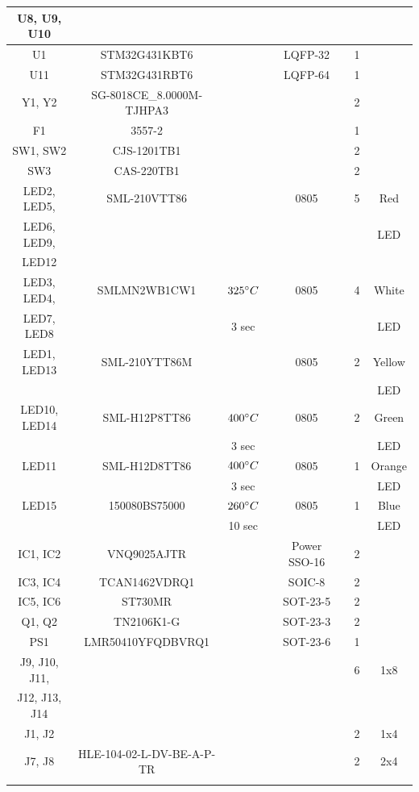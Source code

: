 \documentclass[10pt]{datasheet}
\begin{document}
\begin{longtable}{| c | c | c | c | c | c | c | c |}
    U8, U9, U10 & & & & & & &\\
    \hline
    U1 & STM32G431KBT6 & & & LQFP-32 & \cite{ref8} & 1 &\\
    \hline
    U11 & STM32G431RBT6 & & & LQFP-64 & \cite{ref8} & 1 &\\
    \hline
    Y1, Y2 & SG-8018CE\_8.0000M-TJHPA3 & & & & \cite{ref10} & 2 &\\
    \hline
    F1 & 3557-2 & & & & \cite{ref43} & 1 &\\
    \hline
    SW1, SW2 & CJS-1201TB1 & & & & \cite{ref44} & 2 &\\
    \hline
    SW3 & CAS-220TB1 & & & & \cite{ref45} & 2 &\\
    \hline
    LED2, LED5, & SML-210VTT86 & & & 0805 & \cite{ref46} & 5 & Red\\
    LED6, LED9, & & & & & & & LED\\
    LED12 & & & & & & & \\
    \hline
    LED3, LED4, & SMLMN2WB1CW1 & $325\degree C$ & & 0805 & \cite{ref47} & 4 & White\\
    LED7, LED8 & & 3 sec & & & & & LED\\
    \hline
    LED1, LED13 & SML-210YTT86M & & & 0805 & \cite{ref46} & 2 & Yellow\\
    & & & & & & & LED\\
    \hline
    LED10, LED14 & SML-H12P8TT86 & $400\degree C$ & & 0805 & \cite{ref48} & 2 & Green\\
    & & 3 sec & & & & & LED\\
    \hline
    LED11 & SML-H12D8TT86 & $400\degree C$ & & 0805 & \cite{ref49} & 1 & Orange\\
    & & 3 sec & & & & & LED\\
    \hline
    LED15 & 150080BS75000 & $260\degree C$ & & 0805 & \cite{ref50} & 1 & Blue\\
    & & 10 sec & & & & & LED\\
    \hline
    IC1, IC2 & VNQ9025AJTR & & & Power SSO-16 & \cite{ref16} & 2 &\\
    \hline
    IC3, IC4 & TCAN1462VDRQ1 & & & SOIC-8 & \cite{ref19} & 2 &\\
    \hline
    IC5, IC6 & ST730MR & & & SOT-23-5 & \cite{ref5} & 2 &\\
    \hline
    Q1, Q2 & TN2106K1-G & & & SOT-23-3 & \cite{ref13} & 2 &\\
    \hline
    PS1 & LMR50410YFQDBVRQ1 & & & SOT-23-6 & \cite{ref6} & 1 &\\
    \hline
    J9, J10, J11, & & & & & & 6 & 1x8\\
    J12, J13, J14 & & & & & & &\\
    \hline
    J1, J2 & & & & & & 2 & 1x4\\
    \hline
    J7, J8 & HLE-104-02-L-DV-BE-A-P-TR & & & & \cite{ref51} & 2 & 2x4\\
    \hline
    \thickhline
\end{longtable}
\end{document}
